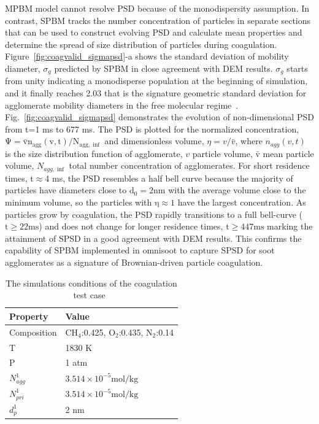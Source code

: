 MPBM model cannot resolve PSD because of the monodispersity assumption. In contrast, SPBM tracks the number concentration of particles in separate sections that can be used to construct evolving PSD and calculate mean properties and determine the spread of size distribution of particles during coagulation. Figure~\ref{fig:coagvalid_sigmapsd}-a shows the standard deviation of mobility diameter, ${\sigma_g}$ predicted by SPBM in close agreement with DEM results. ${\sigma_g}$ starts from unity indicating a monodisperse population at the beginning of simulation, and it finally reaches 2.03 that is the signature geometric standard deviation for agglomerate mobility diameters in the free molecular regime~\citep{vemury1995self}. Fig.~\ref{fig:coagvalid_sigmapsd} demonstrates the evolution of non-dimensional PSD from t=1 ms to 677 ms. The PSD is plotted for the normalized concentration, $\mathrm{\Psi= \bar{v}n_{agg}(v,t)/N_{agg,\inf}}$ and dimensionless volume, ${\eta= v/ \bar{v}}$, where ${n_{agg}(v,t)}$ is the size distribution function of agglomerate, ${v}$ particle volume, $\mathrm{\bar{v}}$ mean particle volume, ${N_{agg,\inf}}$ total number concentration of agglomerates. For short residence times, t$\approx$4 ms, the PSD resembles a half bell curve because the majority of particles have diameters close to $\mathrm{d_0=2 nm}$ with the average volume close to the minimum volume, so the particles with $\mathrm{\eta\approx1}$ have the largest concentration. As particles grow by coagulation, the PSD rapidly transitions to a full bell-curve ($\mathrm{t\ge22 ms}$) and does not change for longer residence times, $\mathrm{t\ge447 ms}$ marking the attainment of SPSD in a good agreement with DEM results. This confirms the capability of SPBM implemented in omnisoot to capture SPSD for soot agglomerates as a signature of Brownian-driven particle coagulation.  

\begin{table}
	\caption{The simulations conditions of the coagulation test case~\citep{kholghy2021surface}}
	\label{tab:simcond_coagtest}
	\centering
	\begin{tabular}{l l}
		\hline
		\textbf{Property} & \textbf{Value} \\
		\hline
		Composition & $\mathrm{CH_4}$:0.425, $\mathrm{O_2}$:0.435, $\mathrm{N_2}$:0.14\\
		T & 1830 K\\
		P & 1 atm \\
		${N^1_{agg}}$ & $3.514\times10^{-5} \mathrm{mol/kg}$ \\ 
		${N^1_{pri}}$ & $3.514\times10^{-5} \mathrm{mol/kg}$\\
		${d^1_{p}}$ & 2 nm \\
		\hline
	\end{tabular}
\end{table}


